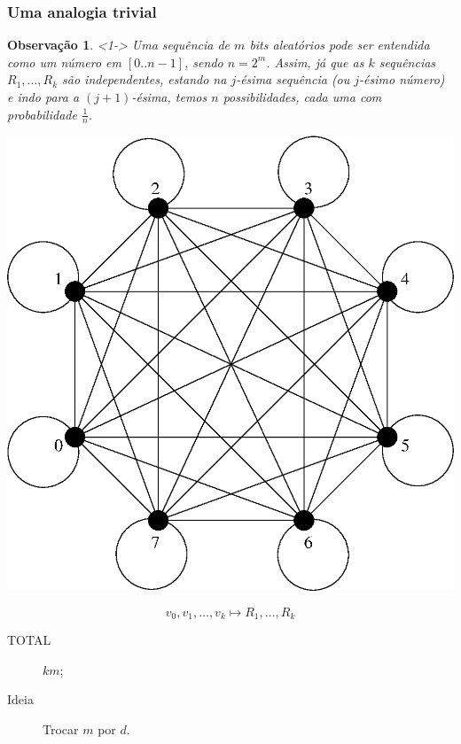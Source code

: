 \documentclass{beamer}
\theoremstyle{teoaxicorlem}
\theoremstyle{defnotnom}
\newtheorem{Obs}{Observação}
\begin{document}
\begin{frame}
  \frametitle{Uma analogia trivial}
  \begin{Obs}<1->
    Uma sequência de $m$ bits aleatórios pode ser entendida como um
    número em $[0..n-1]$, sendo $n=2^m$. \pause
    Assim, já que as $k$ sequências $R_1,\dotsc,R_k$
    são independentes, estando na
    $j$-ésima sequência (ou $j$-ésimo número)
    e indo para a $(j+1)$-ésima,
    temos $n$ possibilidades, cada uma com probabilidade $\frac1n$.
  \end{Obs}
  \vfill\pause
  \parbox{.4\linewidth}{
    \centering
    \includegraphics[height=0.3\paperheight]{k8.eps}
  }\hfill
  \parbox{.5\linewidth}{
    \begin{equation*}
      v_0, v_1, \dotsc, v_k \mapsto R_1,\dotsc,R_k
    \end{equation*}\pause
    \begin{description}
    \item[TOTAL] $km$;
    \item[Ideia] Trocar $m$ por $d$.
    \end{description}
  }
\end{frame}
\end{document}
